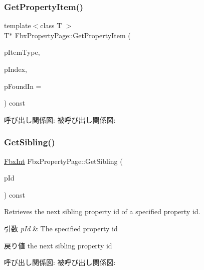 \subsubsection{\texorpdfstring{Get\+Property\+Item()}{GetPropertyItem()}}
{\footnotesize\ttfamily template$<$class T $>$ \\
T$\ast$ Fbx\+Property\+Page\+::\+Get\+Property\+Item (\begin{DoxyParamCaption}\item[{const T $\ast$}]{p\+Item\+Type,  }\item[{\hyperlink{fbxtypes_8h_a088fa96de3b0b3ea69f0f6afef525dfb}{Fbx\+Int}}]{p\+Index,  }\item[{\hyperlink{class_fbx_property_page}{Fbx\+Property\+Page} $\ast$$\ast$}]{p\+Found\+In = {} }\end{DoxyParamCaption}) const}

呼び出し関係図\+:
被呼び出し関係図\+:
\mbox{\label{class_fbx_property_page_afdfaca9fe375ee1254478340f707f7c5}} 
\subsubsection{\texorpdfstring{Get\+Sibling()}{GetSibling()}}
{\footnotesize\ttfamily \hyperlink{fbxtypes_8h_a088fa96de3b0b3ea69f0f6afef525dfb}{Fbx\+Int} Fbx\+Property\+Page\+::\+Get\+Sibling (\begin{DoxyParamCaption}\item[{\hyperlink{fbxtypes_8h_a088fa96de3b0b3ea69f0f6afef525dfb}{Fbx\+Int}}]{p\+Id }\end{DoxyParamCaption}) const}

Retrieves the next sibling property id of a specified property id. 
\begin{DoxyParams}{引数}
{\em p\+Id} & The specified property id \\
\hline
\end{DoxyParams}
\begin{DoxyReturn}{戻り値}
the next sibling property id 
\end{DoxyReturn}
呼び出し関係図\+:
被呼び出し関係図\+:
\mbox{\label{class_fbx_property_page_aafbff3be58063db0f4c08fc020ad5eb8}} 
